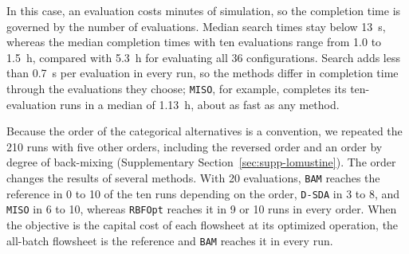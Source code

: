 \documentclass{article}
\begin{document}
In this case, an evaluation costs minutes of simulation, so the completion time is governed by the number of evaluations.
Median search times stay below 13~s, whereas the median completion times with ten evaluations range from 1.0 to 1.5~h, compared with 5.3~h for evaluating all 36 configurations.
Search adds less than 0.7~s per evaluation in every run, so the methods differ in completion time through the evaluations they choose; \texttt{MISO}, for example, completes its ten-evaluation runs in a median of 1.13~h, about as fast as any method.

Because the order of the categorical alternatives is a convention, we repeated the 210 runs with five other orders, including the reversed order and an order by degree of back-mixing (Supplementary Section~\ref{sec:supp-lomustine}).
The order changes the results of several methods.
With 20 evaluations, \texttt{BAM} reaches the reference in 0 to 10 of the ten runs depending on the order, \texttt{D-SDA} in 3 to 8, and \texttt{MISO} in 6 to 10, whereas \texttt{RBFOpt} reaches it in 9 or 10 runs in every order.
When the objective is the capital cost of each flowsheet at its optimized operation, the all-batch flowsheet is the reference and \texttt{BAM} reaches it in every run.
\end{document}
